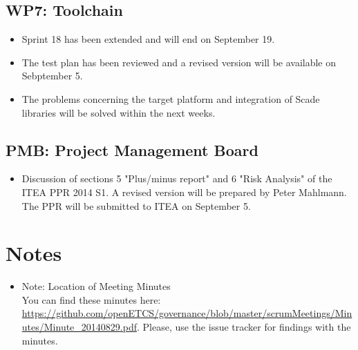 \documentclass[a4paper, 11pt]{article}
\begin{document}
\subsection{WP7: Toolchain}

\begin{itemize}
\item Sprint 18 has been extended and will end on September 19.
\item The test plan has been reviewed and a revised version will be available on Sebptember 5.
\item The problems concerning the target platform and integration of Scade libraries will be solved within the next weeks.
\end{itemize}

\subsection{PMB: Project Management Board}
\begin{itemize}
\item Discussion of sections 5 "Plus/minus report" and 6 "Risk Analysis" of the ITEA PPR 2014 S1. A revised version will be prepared by Peter Mahlmann. The PPR will be submitted to ITEA on September 5.
\end{itemize}

\section{Notes}
\begin{itemize}

\item Note: Location of Meeting Minutes\\
You can find these minutes here: \url{https://github.com/openETCS/governance/blob/master/scrumMeetings/Minutes/Minute_20140829.pdf}. Please, use the issue tracker for findings with the minutes.

\end{itemize}
\end{document}
